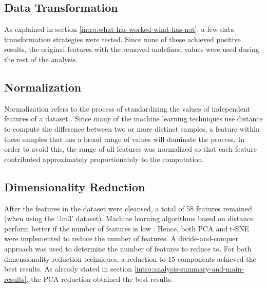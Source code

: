 \subsection{Data Transformation}

As explained in section \ref{intro:what-has-worked-what-has-not}, a few data transformation strategies were tested. Since none of these achieved positive results, the original features with the removed undefined values were used during the rest of the analysis.

\subsection{Normalization}

Normalization refers to the process of standardizing the values of independent features of a dataset \cite{data-mining-intro}. Since many of the machine learning techniques use distance to compute the difference between two or more distinct samples, a feature within these samples that has a broad range of values will dominate the process. In order to avoid this, the range of all features was normalized so that each feature contributed approximately proportionately to the computation.

\subsection{Dimensionality Reduction}

After the features in the dataset were cleansed, a total of 58 features remained (when using the `.lm3' dataset). Machine learning algorithms based on distance perform better if the number of features is low \cite{data-mining-intro}. Hence, both PCA and t-SNE were implemented to reduce the number of features.
A divide-and-conquer approach was used to determine the number of features to reduce to. For both dimensionality reduction techniques, a reduction to 15 components achieved the best results. As already stated in section \ref{intro:analysis-summary-and-main-results}, the PCA reduction obtained the best results.
